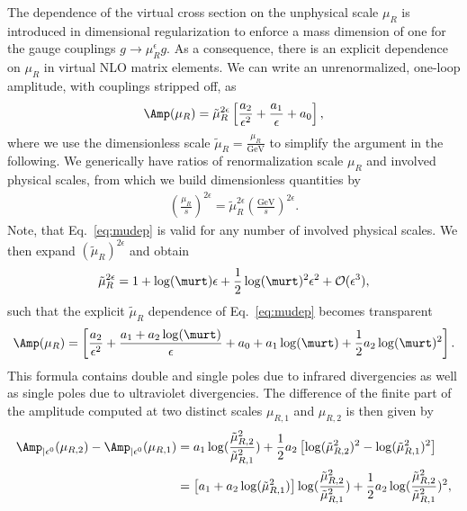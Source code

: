 The dependence of the virtual cross section on the unphysical scale
$\mu_R$ is introduced in
dimensional regularization to enforce a mass dimension of one for the
gauge 
couplings $g\rightarrow \mu_R^{\epsilon}g$. As a consequence, there is
an explicit dependence on $\mu_R$ in virtual NLO matrix elements. We can write an unrenormalized, one-loop
amplitude, with couplings stripped off, as
\begin{align}\label{eq:mudep}
  \Amp(\mu_R) =  \tilde{\mu}_R^{2\epsilon}\left[\frac{a_{2}}{\epsilon^2}+\frac{a_{1}}{\epsilon}
  + a_0\right],
\end{align}
where we use the dimensionless scale $\tilde{\mu}_R =
\frac{\mu_R}{\text{GeV}}$ to simplify the argument in the following. We generically have ratios of
renormalization scale $\mu_R$ and involved physical scales, from which
we build dimensionless quantities by
\begin{align}
 \left(\frac{\mu_R}{s}\right)^{2\epsilon} =\tilde{\mu}_R^{2\epsilon}\left(\frac{\text{GeV}}{s}\right)^{2\epsilon}.
\end{align}
Note, that Eq.~\eqref{eq:mudep} is valid for
any number of involved physical scales.
We then expand $\left(\tilde{\mu}_R\right)^{2\epsilon}$ and obtain
\begin{align}
   \tilde{\mu}_R^{2\epsilon} = 1 +
   \log(\murt)\epsilon+\frac{1}{2}\log(\murt)^2\epsilon^2
   + \mathcal{O}(\epsilon^3),
\end{align}
such that the explicit $\tilde \mu_R$ dependence of
Eq.~\eqref{eq:mudep} becomes transparent
\begin{align}\label{eq:unrenam}
    \Amp(\mu_R)  = \left[\frac{a_{2}}{\epsilon^2}+\frac{a_{1}+a_{2}\log(\murt)}{\epsilon}
  + a_0+a_{1}\log(\murt)+\frac{1}{2}a_{2}\log(\murt)^2\right].
\end{align}
This formula contains double and single poles due to infrared
divergencies as well as single poles due to ultraviolet
divergencies. The difference of the finite part of the amplitude computed at two distinct scales $\mu_{R,1}$ and $\mu_{R,2}$ is then given by
\begin{align}\label{eq:extrapolscale}
\begin{split}
\Amp_{|\epsilon^{0}}({\mu}_{R,2}) -\Amp_{|\epsilon^{0}}({\mu}_{R,1})
  &=  a_1\log(\frac{\tilde{\mu}_{R,2}^2}{\tilde{\mu}_{R,1}^2})
+\frac{1}{2} a_2 \left[
    \log(\tilde{\mu}_{R,2}^2)^2-
    \log(\tilde{\mu}_{R,1}^2)^2\right]\\
&=  \left[a_1+a_2\log(\tilde{\mu}_{R,1}^2)\right]\log(\frac{\tilde{\mu}_{R,2}^2}{\tilde{\mu}_{R,1}^2})
+\frac{1}{2} a_2
\log(\frac{\tilde{\mu}_{R,2}^2}{\tilde{\mu}_{R,1}^2})^2,
\end{split}
\end{align}

